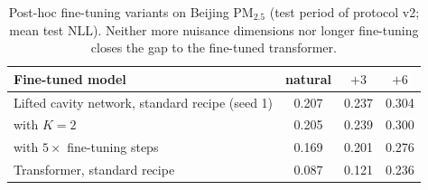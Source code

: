 \begin{table}[h]
\centering\small
\caption{\label{tab:explore}Post-hoc fine-tuning variants on Beijing PM$_{2.5}$ (test period of protocol v2; mean test NLL). Neither more nuisance dimensions nor longer fine-tuning closes the gap to the fine-tuned transformer.}
\begin{tabular}{lccc}
\toprule
Fine-tuned model & natural & $+3$ & $+6$\\
\midrule
Lifted cavity network, standard recipe (seed 1) & 0.207 & 0.237 & 0.304\\
\quad with $K=2$ & 0.205 & 0.239 & 0.300\\
\quad with $5\times$ fine-tuning steps & 0.169 & 0.201 & 0.276\\
Transformer, standard recipe & 0.087 & 0.121 & 0.236\\
\bottomrule
\end{tabular}
\end{table}

